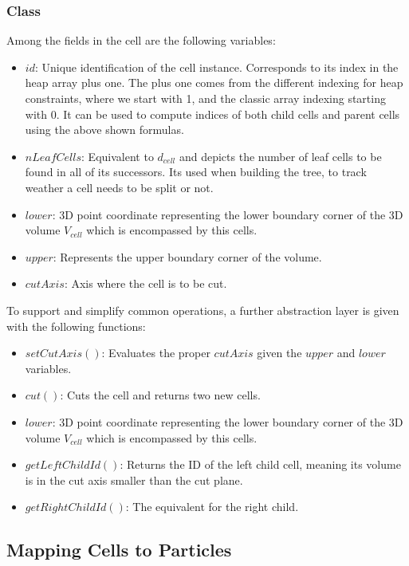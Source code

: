 \documentclass[]{article}
\begin{document}
\subsubsection{Class}
Among the fields in the cell are the following variables:

\begin{itemize}
	\item $id$: Unique identification of the cell instance. Corresponds to its index in the heap array plus one. The plus one comes from the different indexing for heap constraints, where we start with 1, and the classic array indexing starting with 0. It can be used to compute  indices of both child cells and parent cells using the above shown formulas.
	\item $nLeafCells$: Equivalent to  $d_{cell}$ and depicts the number of leaf cells to be found in all of its successors. Its used when building the tree, to track weather a cell needs to be split or not. 
	\item $lower$: 3D point coordinate representing the lower boundary corner of the 3D volume $V_{cell}$ which is encompassed by this cells.
	\item $upper$: Represents the upper boundary corner of the volume.	
	\item $cutAxis$: Axis where the cell is to be cut. 
\end{itemize}

To support and simplify common operations, a further abstraction layer is given with the following functions:


\begin{itemize}
	\item $setCutAxis()$: Evaluates the proper $cutAxis$ given the $upper$ and $lower$ variables.
	\item $cut()$: Cuts the cell and returns two new cells. 
	\item $lower$: 3D point coordinate representing the lower boundary corner of the 3D volume $V_{cell}$ which is encompassed by this cells.
	\item $getLeftChildId()$: Returns the ID of the left child cell, meaning its volume is in the cut axis smaller than the cut plane. 
	\item $getRightChildId()$: The equivalent for the right child. 
\end{itemize} 

\subsection{Mapping Cells to Particles}
\end{document}
